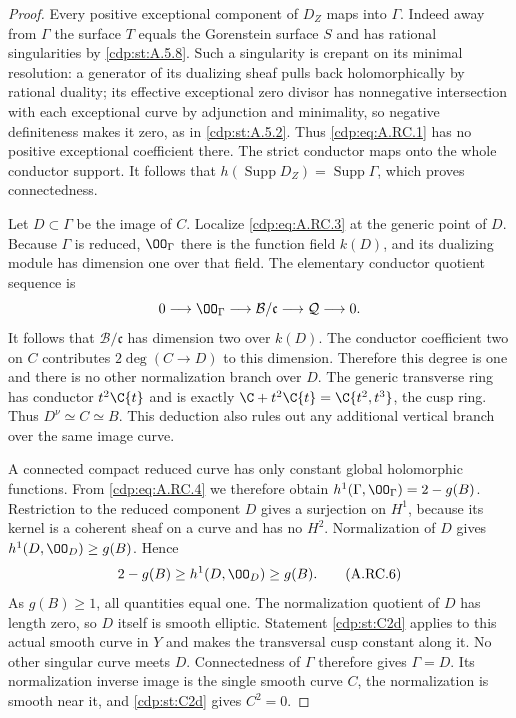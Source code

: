 \begin{proof}
Every positive exceptional component of $D_Z$ maps into
$\Gamma$. Indeed away from $\Gamma$ the surface $T$ equals
the Gorenstein surface $S$ and has rational singularities by
\ref{cdp:st:A.5.8}. Such a singularity is crepant on its minimal resolution:
a generator of its dualizing sheaf pulls back holomorphically
by rational duality; its effective exceptional zero divisor
has nonnegative intersection with each exceptional curve by
adjunction and minimality, so negative definiteness makes it
zero, as in \ref{cdp:st:A.5.2}. Thus \eqref{cdp:eq:A.RC.1} has no positive exceptional
coefficient there. The strict conductor maps onto the whole
conductor support. It follows that
$h(\operatorname{Supp}D_Z)=\operatorname{Supp}\Gamma$,
which proves connectedness.

Let $D\subset\Gamma$ be the image of $C$. Localize \eqref{cdp:eq:A.RC.3}
at the generic point of $D$. Because $\Gamma$ is reduced,
$\OO_\Gamma$ there is the function field $k(D)$, and its
dualizing module has dimension one over that field. The
elementary conductor quotient sequence is
\[
 0\longrightarrow\OO_\Gamma\longrightarrow
          \mathcal B/\mathfrak c
   \longrightarrow\mathcal Q\longrightarrow0.
\]
It follows that $\mathcal B/\mathfrak c$ has dimension two
over $k(D)$. The conductor coefficient two on $C$ contributes
$2\deg(C\to D)$ to this dimension. Therefore this degree is
one and there is no other normalization branch over $D$.
The generic transverse ring has conductor $t^2\C\{t\}$ and
is exactly $\C+t^2\C\{t\}=\C\{t^2,t^3\}$, the cusp ring.
Thus $D^\nu\simeq C\simeq B$. This deduction also rules out
any additional vertical branch over the same image curve.

A connected compact reduced curve has only constant global
holomorphic functions. From \eqref{cdp:eq:A.RC.4} we therefore obtain
$h^1(\Gamma,\OO_\Gamma)=2-g(B)$.
Restriction to the reduced component $D$ gives a surjection
on $H^1$, because its kernel is a coherent sheaf on a curve
and has no $H^2$. Normalization of $D$ gives
$h^1(D,\OO_D)\ge g(B)$. Hence
\[
             2-g(B)\ge h^1(D,\OO_D)\ge g(B).         \tag{A.RC.6}\label{cdp:eq:A.RC.6}
\]
As $g(B)\ge1$, all quantities equal one. The normalization
quotient of $D$ has length zero, so $D$ itself is smooth
elliptic. Statement \ref{cdp:st:C2d} applies to this actual smooth curve
in $Y$ and makes the transversal cusp constant along it.
No other singular curve meets $D$. Connectedness of $\Gamma$
therefore gives $\Gamma=D$. Its normalization inverse image
is the single smooth curve $C$, the normalization is smooth
near it, and \ref{cdp:st:C2d} gives $C^2=0$.


\end{proof}
